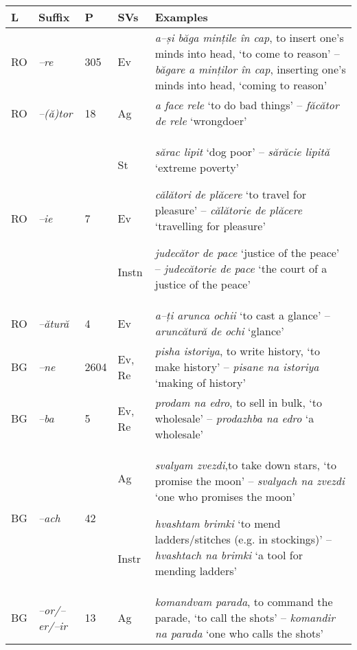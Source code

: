 \documentclass[output=paper]{langsci/langscibook}
\begin{document}
\begin{table}[H]
\begin{tabular}{p{0.4cm}p{1cm}p{0.5cm}p{1cm}p{6.9cm}}
\lsptoprule
{ \textbf{L}} &
{ \textbf{Suffix}} &
{ \textbf{P}} &
{ \textbf{SVs}} &
{ \textbf{Examples}}\\
\midrule
{ RO} &
{ \textit{–re}} &
{ 305} &
{ Ev} &
{ \textit{a–și băga mințile în cap},  to insert
one’s minds into head, ‘to come to reason’ – \textit{băgare a minților în
cap}, inserting one’s minds into head, ‘coming to reason’}\\
{ RO} &
{ \textit{–(ă)tor}} &
{ 18} &
{ Ag} &
{ \textit{a face rele} ‘to do bad things’ –
\textit{făcător de rele} ‘wrongdoer’}\\
{ RO} &
{ \textit{–ie}} &
{ 7} &
{ St}

~

{ Ev}

~

{ Instn} &
{ \textit{sărac lipit} ‘dog poor’ – \textit{sărăcie
lipită} ‘extreme poverty’}

{ \textit{călători de plăcere} ‘to travel for
pleasure’ – \textit{călătorie de plăcere} ‘travelling for pleasure’}

{ \textit{judecător de pace} ‘justice of the
peace’ – \textit{judecătorie de pace} ‘the court of a justice of the
peace’}\\

{ RO} &
{ \textit{–ătură}} &
{ 4} &
{ Ev} &
{ \textit{a–ți arunca ochii} ‘to cast a
glance’ –\textit{aruncătură de ochi} ‘glance’}\\
{ BG} &
{ \textit{–ne}} &
{ 2604} &
{ Ev, Re} &
{ \textit{pisha istoriya}, to write history,
‘to make history’ – \textit{pisane na istoriya} ‘making of history’}\\
{ BG} &
{ \textit{–ba}} &
{ 5} &
{ Ev, Re} &
{ \textit{prodam na edro}, to sell in bulk,
‘to wholesale’ – \textit{prodazhba na edro} ‘a wholesale’}\\
{ BG} &
{ \textit{–ach}} &
{ 42} &
{ Ag}

~

~

{ Instr} &
{ \textit{svalyam zvezdi},to take down stars,
‘to promise the moon’ – \textit{svalyach na zvezdi} ‘one who promises the
moon’}

{ \textit{hvashtam brimki} ‘to mend
ladders/stitches (e.g. in stockings)’ – \textit{hvashtach na brimki}  ‘a tool
for mending ladders’}\\

{ BG} &
{ \textit{–or/–er/–ir}} &
{ 13} &
{ Ag} &
{ \textit{komandvam parada}, to command the
parade, ‘to call the shots’ – \textit{komandir na parada} ‘one who calls
the shots’}\\


\end{tabular}
\end{table}
\end{document}
